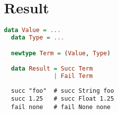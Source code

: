 \chapter{Result}

\begin{lstlisting}[language=haskell]
  data Value = ...
  data Type = ...

  newtype Term = (Value, Type)

  data Result = Succ Term
              | Fail Term
\end{lstlisting}

\begin{example}
\begin{lstlisting}
  succ "foo"  # succ String foo
  succ 1.25   # succ Float 1.25
  fail none   # fail None none
\end{lstlisting}
\end{example}
